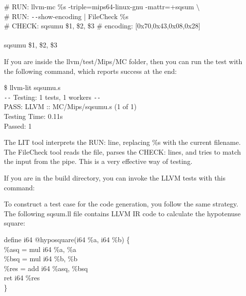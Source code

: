 \begin{tcolorbox}[colback=white,colframe=black]
\# RUN: llvm-mc \%s -triple=mips64-linux-gnu -mattr=+sqsum $\setminus$ \\
\# RUN: \verb|--|show-encoding | FileCheck \%s \\
\# CHECK: sqsumu \$1, \$2, \$3 \# encoding: [0x70,0x43,0x08,0x28] \\
\\
\hspace*{1cm}sqsumu \$1, \$2, \$3
\end{tcolorbox}

If you are inside the llvm/test/Mips/MC folder, then you can run the test with the following command, which reports success at the end:\par

\begin{tcolorbox}[colback=white,colframe=black]
\$ llvm-lit sqsumu.s \\
\verb|--| Testing: 1 tests, 1 workers \verb|--| \\
PASS: LLVM :: MC/Mips/sqsumu.s (1 of 1) \\
Testing Time: 0.11s \\
\hspace*{0.5cm}Passed: 1
\end{tcolorbox}

The LIT tool interprets the RUN: line, replacing \%s with the current filename. The FileCheck tool reads the file, parses the CHECK: lines, and tries to match the input from the pipe. This is a very effective way of testing.\par

If you are in the build directory, you can invoke the LLVM tests with this command:\par

To construct a test case for the code generation, you follow the same strategy. The following sqsum.ll file contains LLVM IR code to calculate the hypotenuse square:\par

\begin{tcolorbox}[colback=white,colframe=black]
define i64 @hyposquare(i64 \%a, i64 \%b) \{ \\
\hspace*{0.5cm}\%asq = mul i64 \%a, \%a \\
\hspace*{0.5cm}\%bsq = mul i64 \%b, \%b \\
\hspace*{0.5cm}\%res = add i64 \%asq, \%bsq \\
\hspace*{0.5cm}ret i64 \%res \\
\}
\end{tcolorbox}

